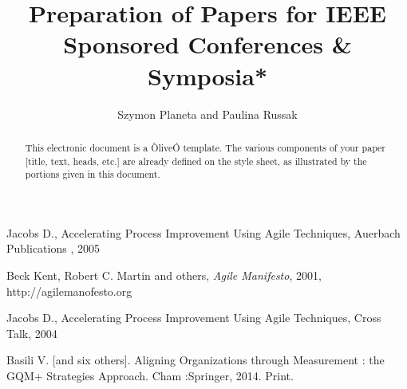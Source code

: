 \documentclass[letterpaper, 10 pt, conference]{ieeeconf}  %
\title{\LARGE \bf
Preparation of Papers for IEEE Sponsored Conferences \& Symposia*
}
\author{Szymon Planeta and Paulina Russak%
}
\begin{document}
\maketitle
\thispagestyle{empty}
\pagestyle{empty}


\begin{abstract}

This electronic document is a ÒliveÓ template. The various components of your paper [title, text, heads, etc.] are already defined on the style sheet, as illustrated by the portions given in this document.

\end{abstract}












\begin{thebibliography}{99}

 Jacobs D., Accelerating Process Improvement Using Agile Techniques,  Auerbach Publications , 2005

 Beck Kent, Robert C. Martin and others, \emph{Agile Manifesto}, 2001, http://agilemanofesto.org

 Jacobs D., Accelerating Process Improvement Using Agile Techniques,  Cross Talk, 2004

 Basili V. [and six others]. Aligning Organizations through Measurement : the GQM+ Strategies Approach. Cham :Springer, 2014. Print.




\end{thebibliography}
\end{document}
